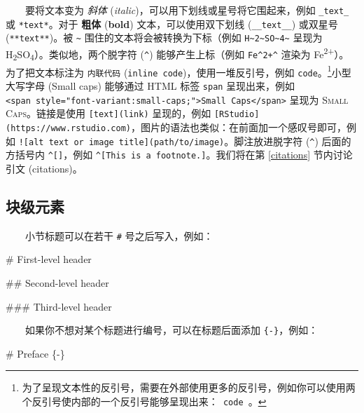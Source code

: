 \documentclass[
  12pt,
]{krantz}
\newenvironment{Shaded}{\begin{snugshade}}{\end{snugshade}}
\newcommand{\FunctionTok}[1]{\textcolor[rgb]{0.00,0.00,0.00}{#1}}
\theoremstyle{definition}
\theoremstyle{definition}
\theoremstyle{definition}
\theoremstyle{definition}
\theoremstyle{remark}
\begin{document}
  要将文本变为 \emph{斜体} (\emph{italic})，可以用下划线或星号将它围起来，例如 \texttt{\_text\_} 或 \texttt{*text*}。对于 \textbf{粗体} (\textbf{bold}) 文本，可以使用双下划线 (\texttt{\_\_text\_\_}) 或双星号 (\texttt{**text**})。被 \texttt{\textasciitilde{}} 围住的文本将会被转换为下标（例如 \texttt{H\textasciitilde{}2\textasciitilde{}SO\textasciitilde{}4\textasciitilde{}} 呈现为 H\textsubscript{2}SO\textsubscript{4}）。类似地，两个脱字符 (\texttt{\^{}}) 能够产生上标（例如 \texttt{Fe\^{}2+\^{}} 渲染为 Fe\textsuperscript{2+}）。为了把文本标注为 \texttt{内联代码} (\texttt{inline\ code})，使用一堆反引号，例如 \texttt{\textasciigrave{}code\textasciigrave{}}。\footnote{为了呈现文本性的反引号，需要在外部使用更多的反引号，例如你可以使用两个反引号使内部的一个反引号能够呈现出来：\texttt{\textasciigrave{}\textasciigrave{}\ \textasciigrave{}code\textasciigrave{}\ \textasciigrave{}\textasciigrave{}}。}小型大写字母 (Small caps) 能够通过 HTML 标签 \texttt{span} 呈现出来，例如 \texttt{\textless{}span\ style="font-variant:small-caps;"\textgreater{}Small\ Caps\textless{}/span\textgreater{}} 呈现为 \textsc{Small Caps}。链接是使用 \texttt{{[}text{]}(link)} 呈现的，例如 \texttt{{[}RStudio{]}(https://www.rstudio.com)}，图片的语法也类似：在前面加一个感叹号即可，例如 \texttt{!{[}alt\ text\ or\ image\ title{]}(path/to/image)}。脚注放进脱字符 (\texttt{\^{}}) 后面的方括号内 \texttt{\^{}{[}{]}}，例如 \texttt{\^{}{[}This\ is\ a\ footnote.{]}}。我们将在第 \ref{citations} 节内讨论引文 (citations)。

\hypertarget{ux5757ux7ea7ux5143ux7d20}{%
\subsection{块级元素}\label{ux5757ux7ea7ux5143ux7d20}}

  小节标题可以在若干 \texttt{\#} 号之后写入，例如：

\begin{Shaded}
\begin{Highlighting}[]
\FunctionTok{\# First{-}level header}

\FunctionTok{\#\# Second{-}level header}

\FunctionTok{\#\#\# Third{-}level header}
\end{Highlighting}
\end{Shaded}

  如果你不想对某个标题进行编号，可以在标题后面添加 \texttt{\{-\}}，例如：

\begin{Shaded}
\begin{Highlighting}[]
\FunctionTok{\# Preface \{{-}\}}
\end{Highlighting}
\end{Shaded}
\end{document}
